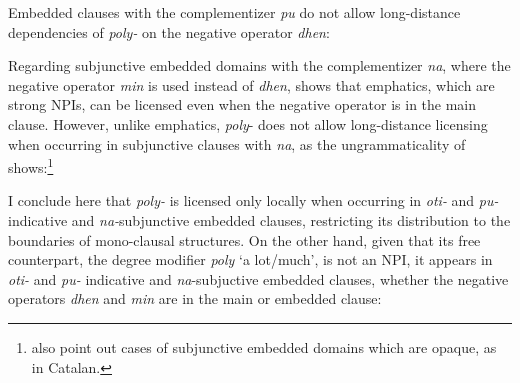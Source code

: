 \documentclass[output=paper]{langscibook}
\begin{document}
\noindent Embedded clauses with the complementizer \textit{pu} do not allow long-distance dependencies of \textit{poly-} on the negative operator \textit{dhen}:

\begin{exe}
\ex\label{gia:ex19} \begin{xlist}
        \label{gia:ex19b}
    \end{xlist}
\end{exe}

\noindent Regarding subjunctive embedded domains with the complementizer \textit{na}, where the negative operator \textit{min} is used instead of \textit{dhen}, \citet{giannaki1997dissert, giannaki1998} shows that emphatics, which are strong NPIs, can be licensed even when the negative operator is in the main clause. However, unlike emphatics, \textit{poly}- does not allow long-distance licensing when occurring in subjunctive clauses with \textit{na}, as the ungrammaticality of  shows:\footnote{\citet{giannakiquer1997} also point out cases of subjunctive embedded domains which are opaque, as in Catalan.}

\begin{exe}
\ex\label{gia:ex20} \begin{xlist}
        \label{gia:ex20b}
    \end{xlist}
\end{exe}

\noindent I conclude here that \textit{poly-} is licensed only locally when occurring in \textit{oti-} and \textit{pu-}indicative and \textit{na-}subjunctive embedded clauses, restricting its distribution to the boundaries of mono-clausal structures. On the other hand, given that its free counterpart, the degree modifier \textit{poly} `a lot/much', is not an NPI, it appears in \textit{oti-}  and \textit{pu-} indicative and \textit{na}-subjuctive embedded clauses, whether the negative operators \textit{dhen} and \textit{min} are in the main or embedded clause:
\end{document}
